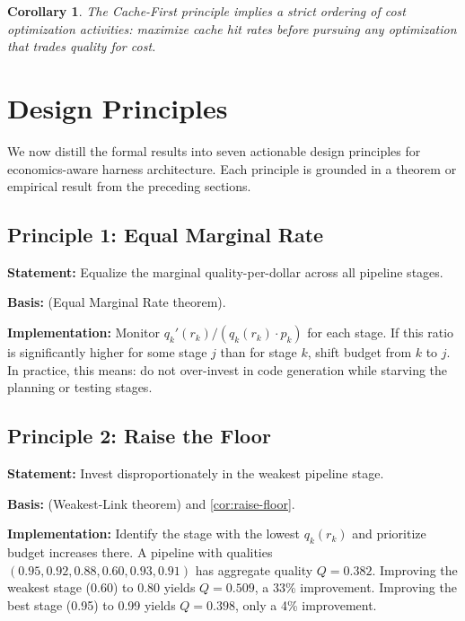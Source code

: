 \documentclass[11pt, a4paper, logo, copyright]{googledeepmind}
\newtheorem{corollary}{Corollary}[section]
\begin{document}
\begin{corollary}\label{cor:cache-first}
The Cache-First principle implies a strict ordering of cost optimization activities: maximize cache hit rates before pursuing any optimization that trades quality for cost.
\end{corollary}


\section{Design Principles}\label{sec:principles}

We now distill the formal results into seven actionable design principles for economics-aware harness architecture. Each principle is grounded in a theorem or empirical result from the preceding sections.

\subsection{Principle 1: Equal Marginal Rate}

\textbf{Statement:} Equalize the marginal quality-per-dollar across all pipeline stages.

\textbf{Basis:}  (Equal Marginal Rate theorem).

\textbf{Implementation:} Monitor $q_k'(r_k) / (q_k(r_k) \cdot p_k)$ for each stage. If this ratio is significantly higher for some stage $j$ than for stage $k$, shift budget from $k$ to $j$. In practice, this means: do not over-invest in code generation while starving the planning or testing stages.

\subsection{Principle 2: Raise the Floor}

\textbf{Statement:} Invest disproportionately in the weakest pipeline stage.

\textbf{Basis:}  (Weakest-Link theorem) and \cref{cor:raise-floor}.

\textbf{Implementation:} Identify the stage with the lowest $q_k(r_k)$ and prioritize budget increases there. A pipeline with qualities $(0.95, 0.92, 0.88, 0.60, 0.93, 0.91)$ has aggregate quality $Q = 0.382$. Improving the weakest stage (0.60) to 0.80 yields $Q = 0.509$, a 33\% improvement. Improving the best stage (0.95) to 0.99 yields $Q = 0.398$, only a 4\% improvement.
\end{document}
